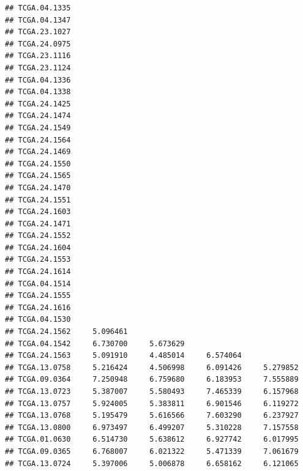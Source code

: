\documentclass[UTF8]{beamer}\usepackage[]{graphicx}\usepackage[]{color}
\makeatletter
\newenvironment{kframe}{%
 \def\at@end@of@kframe{}%
 \ifinner\ifhmode%
  \def\at@end@of@kframe{\end{minipage}}%
  \begin{minipage}{\columnwidth}%
 \fi\fi%
 \def\FrameCommand##1{\hskip\@totalleftmargin \hskip-\fboxsep
 \colorbox{shadecolor}{##1}\hskip-\fboxsep
     \hskip-\linewidth \hskip-\@totalleftmargin \hskip\columnwidth}%
 \MakeFramed {\advance\hsize-\width
   \@totalleftmargin\z@ \linewidth\hsize
   \@setminipage}}%
 {\par\unskip\endMakeFramed%
 \at@end@of@kframe}
\newenvironment{knitrout}{}{} %
\makeatother
\begin{document}
\begin{frame}[fragile]
\begin{knitrout}
\begin{kframe}
\begin{verbatim}
## TCGA.04.1335                                                    
## TCGA.04.1347                                                    
## TCGA.23.1027                                                    
## TCGA.24.0975                                                    
## TCGA.23.1116                                                    
## TCGA.23.1124                                                    
## TCGA.04.1336                                                    
## TCGA.04.1338                                                    
## TCGA.24.1425                                                    
## TCGA.24.1474                                                    
## TCGA.24.1549                                                    
## TCGA.24.1564                                                    
## TCGA.24.1469                                                    
## TCGA.24.1550                                                    
## TCGA.24.1565                                                    
## TCGA.24.1470                                                    
## TCGA.24.1551                                                    
## TCGA.24.1603                                                    
## TCGA.24.1471                                                    
## TCGA.24.1552                                                    
## TCGA.24.1604                                                    
## TCGA.24.1553                                                    
## TCGA.24.1614                                                    
## TCGA.04.1514                                                    
## TCGA.24.1555                                                    
## TCGA.24.1616                                                    
## TCGA.04.1530                                                    
## TCGA.24.1562     5.096461                                       
## TCGA.04.1542     6.730700     5.673629                          
## TCGA.24.1563     5.091910     4.485014     6.574064             
## TCGA.13.0758     5.216424     4.506998     6.091426     5.279852
## TCGA.09.0364     7.250948     6.759680     6.183953     7.555889
## TCGA.13.0723     5.387007     5.580493     7.465339     6.157968
## TCGA.13.0757     5.924005     5.383811     6.901546     6.119272
## TCGA.13.0768     5.195479     5.616566     7.603290     6.237927
## TCGA.13.0800     6.973497     6.499207     5.310228     7.157558
## TCGA.01.0630     6.514730     5.638612     6.927742     6.017995
## TCGA.09.0365     6.768007     6.021322     5.471339     7.061679
## TCGA.13.0724     5.397006     5.006878     6.658162     6.121065

\end{verbatim}
\end{kframe}
\end{knitrout}
\end{frame}
\end{document}
